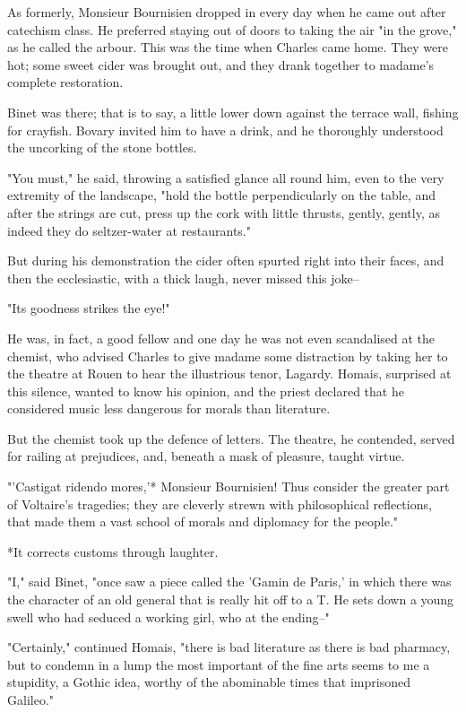 \documentclass[11pt,twocolumn]{ltugboat}
\begin{document}
As formerly, Monsieur Bournisien dropped in every day when he came out
after catechism class. He preferred staying out of doors to taking the
air "in the grove," as he called the arbour. This was the time when
Charles came home. They were hot; some sweet cider was brought out, and
they drank together to madame's complete restoration.

Binet was there; that is to say, a little lower down against the terrace
wall, fishing for crayfish. Bovary invited him to have a drink, and he
thoroughly understood the uncorking of the stone bottles.

"You must," he said, throwing a satisfied glance all round him, even to
the very extremity of the landscape, "hold the bottle perpendicularly on
the table, and after the strings are cut, press up the cork with
little thrusts, gently, gently, as indeed they do seltzer-water at
restaurants."

But during his demonstration the cider often spurted right into their
faces, and then the ecclesiastic, with a thick laugh, never missed this
joke--

"Its goodness strikes the eye!"

He was, in fact, a good fellow and one day he was not even scandalised
at the chemist, who advised Charles to give madame some distraction
by taking her to the theatre at Rouen to hear the illustrious tenor,
Lagardy. Homais, surprised at this silence, wanted to know his opinion,
and the priest declared that he considered music less dangerous for
morals than literature.

But the chemist took up the defence of letters. The theatre, he
contended, served for railing at prejudices, and, beneath a mask of
pleasure, taught virtue.

"'Castigat ridendo mores,'* Monsieur Bournisien! Thus consider the
greater part of Voltaire's tragedies; they are cleverly strewn with
philosophical reflections, that made them a vast school of morals and
diplomacy for the people."

     *It corrects customs through laughter.


"I," said Binet, "once saw a piece called the 'Gamin de Paris,' in which
there was the character of an old general that is really hit off to a
T. He sets down a young swell who had seduced a working girl, who at the
ending--"

"Certainly," continued Homais, "there is bad literature as there is bad
pharmacy, but to condemn in a lump the most important of the fine arts
seems to me a stupidity, a Gothic idea, worthy of the abominable times
that imprisoned Galileo."
\end{document}
